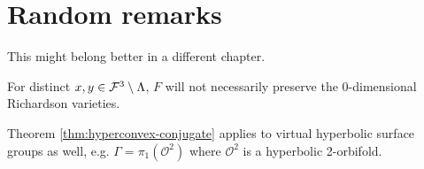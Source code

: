 \section{Random remarks}
This might belong better in a different chapter.

\begin{remark}
    For distinct $x,y \in \mathcal{F}^3 \setminus \Lambda$, 
    $F$ will not necessarily preserve the 0-dimensional Richardson varieties.
\end{remark}

\begin{remark}
    Theorem \ref{thm:hyperconvex-conjugate} applies to virtual hyperbolic surface groups as well, 
    e.g. $\Gamma = \pi_1(\mathcal{O}^2)$ where $\mathcal{O}^2$ is a hyperbolic 2-orbifold.
\end{remark}